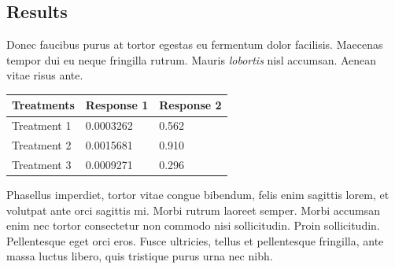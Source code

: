 \documentclass[a1,portrait]{a1poster}
\begin{document}
\begin{multicols}{2}





\section*{Results}


Donec faucibus purus at tortor egestas eu fermentum dolor facilisis. Maecenas tempor dui eu neque fringilla rutrum. Mauris \emph{lobortis} nisl accumsan. Aenean vitae risus ante.
%
\begin{table} %
\begin{tabular}{l l l}
\toprule
\textbf{Treatments} & \textbf{Response 1} & \textbf{Response 2}\\
\midrule
Treatment 1 & 0.0003262 & 0.562 \\
Treatment 2 & 0.0015681 & 0.910 \\
Treatment 3 & 0.0009271 & 0.296 \\
\bottomrule
\end{tabular}
\end{table}
%
Phasellus imperdiet, tortor vitae congue bibendum, felis enim sagittis lorem, et volutpat ante orci sagittis mi. Morbi rutrum laoreet semper. Morbi accumsan enim nec tortor consectetur non commodo nisi sollicitudin. Proin sollicitudin. Pellentesque eget orci eros. Fusce ultricies, tellus et pellentesque fringilla, ante massa luctus libero, quis tristique purus urna nec nibh.


\end{multicols}
\end{document}

